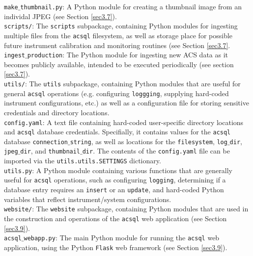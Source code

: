 \documentclass[10pt,journal,compsoc]{IEEEtran}
\begin{document}
\noindent\texttt{make$\_$thumbnail.py}: A Python module for creating a thumbnail image from an individal JPEG (see Section \ref{sec3.7}).\\

\noindent\texttt{scripts/}: The \texttt{scripts} subpackage, containing Python modules for ingesting multiple files from the \texttt{acsql} filesystem, as well as storage place for possible
future instrument calibration and monitoring routines (see Section \ref{sec3.7}.\\

\noindent\texttt{ingest$\_$production}: The Python module for ingesting new ACS data as it becomes publicly available, intended to be executed periodically (see section \ref{sec3.7}).\\

\noindent\texttt{utils/}: The \texttt{utils} subpackage, containing Python modules that are useful for general \texttt{acsql} operations (e.g. configuring \texttt{loggging}, supplying hard-coded
instrument configurations, etc.) as well as a configuration file for storing sensitive credentials and directory locations.\\

\noindent\texttt{config.yaml}: A text file containing hard-coded user-specific directory locations and \texttt{acsql} database credentials.  Specifially, it contains values for the \texttt{acsql}
database \texttt{connection$\_$string}, as well as locations for the \texttt{filesystem}, \texttt{log$\_$dir}, \texttt{jpeg$\_$dir}, and \texttt{thumbnail$\_$dir}.  The contents of the
\texttt{config.yaml} file can be imported via the \texttt{utils.utils.SETTINGS} dictionary.\\

\noindent\texttt{utils.py}: A Python module containing various functions that are generally useful for \texttt{acsql} operations, such as configuring \texttt{logging}, determining if a database
entry requires an \texttt{insert} or an \texttt{update}, and hard-coded Python variables that reflect instrument/system configurations.\\

\noindent\texttt{website/}: The \texttt{website} subpackage, containing Python modules that are used in the construction and operations of the \texttt{acsql} web application (see Section \ref{sec3.9}).\\

\noindent\texttt{acsql$\_$webapp.py}: The main Python module for running the \texttt{acsql} web application, using the Python \texttt{Flask} web framework (see Section \ref{sec3.9}).\\
\end{document}
